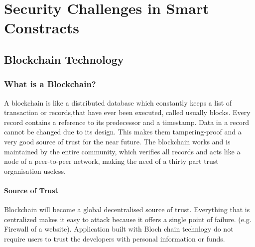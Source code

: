

\chapter{Security Challenges in Smart Constracts}


\newpage

\minitoc %

\newpage


\section{Blockchain Technology}
\subsection{What is a Blockchain?}
A blockchain is like a distributed database which constantly keeps a list of transaction or records,that have ever been executed, called usually blocks. Every record contains a reference to its predecessor and a timestamp.
Data in a record cannot be changed due to its design. This makes them tampering-proof and a very good source of trust for the near future.
The blockchain works and is maintained by the entire community, which verifies all records and acts like a node of a peer-to-peer network, making the need of a thirty part trust organisation useless.
\subsubsection{Source of Trust}
Blockchain will become a global decentralised source of trust.
Everything that is centralized makes it easy to attack because it offers a single point of failure. 
(e.g. Firewall of a website). 
Application built with Bloch chain technlogy do not require  users to trust the developers with personal information or funds. 
